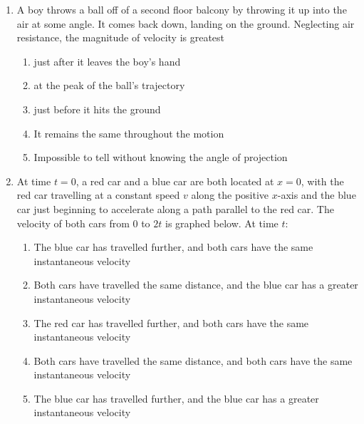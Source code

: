\begin{multicols}{2}
\begin{enumerate}[leftmargin=12pt]
  \item A boy throws a ball off of a second floor balcony by throwing it up
    into the air at some angle. It comes back down, landing on the ground.
    Neglecting air resistance, the magnitude of velocity is greatest
    \begin{enumerate}[noitemsep]
    \item just after it leaves the boy's hand
    \item at the peak of the ball's trajectory
    \item just before it hits the ground
    \item It remains the same throughout the motion
    \item Impossible to tell without knowing the angle of projection
    \end{enumerate}
  
  \item At time $t=0$, a red car and a blue car are both located at $x=0$,
    with the red car travelling at a constant speed $v$ along the positive
    $x$-axis and the blue car just beginning to accelerate along a path parallel
    to the red car. The velocity of both cars from $0$ to $2t$ is graphed below.
    At time $t$:
    \begin{center}
    \end{center}
    \begin{enumerate}[noitemsep]
    \item The blue car has travelled further, and both cars have the
      same instantaneous velocity
    \item Both cars have travelled the same distance, and the blue
      car has a greater instantaneous velocity
    \item The red car has travelled further, and both cars have the same
      instantaneous velocity
    \item Both cars have travelled the same distance, and both cars have the
      same instantaneous velocity
    \item The blue car has travelled further, and the blue car has a greater
      instantaneous velocity
    \end{enumerate}
    

\end{enumerate}
\end{multicols}
